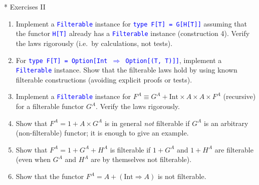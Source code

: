 \documentclass[english]{beamer}
\begin{document}
\begin{frame}{{*} Exercises II}
\begin{enumerate}
\item Implement a \texttt{\textcolor{blue}{\footnotesize{}Filterable}} instance
for \texttt{\textcolor{blue}{\footnotesize{}type F{[}T{]} = G{[}H{[}T{]}{]}}}
assuming that the functor \texttt{\textcolor{blue}{\footnotesize{}H{[}T{]}}}
already has a \texttt{\textcolor{blue}{\footnotesize{}Filterable}}
instance (construction 4). Verify the laws rigorously (i.e.\ by calculations,
not tests).
\item For \texttt{\textcolor{blue}{\footnotesize{}type F{[}T{]} = Option{[}Int
$\Rightarrow$ Option{[}(T, T){]}{]}}}, implement a \texttt{\textcolor{blue}{\footnotesize{}Filterable}}
instance. Show that the filterable laws hold by using known filterable
constructions (avoiding explicit proofs or tests).
\item Implement a \texttt{\textcolor{blue}{\footnotesize{}Filterable}} instance
for $F^{A}\equiv G^{A}+\text{Int}\times A\times A\times F^{A}$ (recursive)
for a filterable functor $G^{A}$. Verify the laws rigorously.
\item Show that $F^{A}=1+A\times G^{A}$ is in general \emph{not} filterable
if $G^{A}$ is an arbitrary (non-filterable) functor; it is enough
to give an example.
\item Show that $F^{A}=1+G^{A}+H^{A}$ is filterable if $1+G^{A}$ and $1+H^{A}$
are filterable (even when $G^{A}$ and $H^{A}$ are by themselves
not filterable).
\item Show that the functor $F^{A}=A+\left(\text{Int}\Rightarrow A\right)$
is not filterable.
\end{enumerate}
\end{frame}
\end{document}

